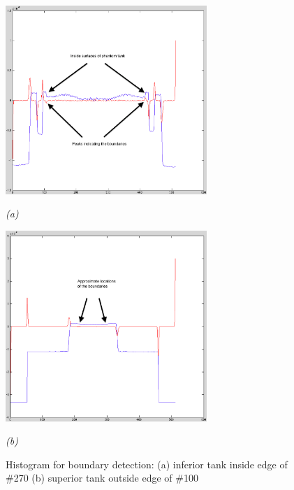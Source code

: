 \begin{figure}[htb]
  \begin{minipage}[b]{3in}
    \centering
    \centerline{\mbox{\includegraphics[width=3in]{data_extraction/images/sample/20121017_270/Coronal/inferior_inside/histogram_marked.eps}}}
    \centerline{\emph{(a)}}
  \end{minipage}
  \hfill
  \begin{minipage}[b]{3in}
    \centering
    \centerline{\mbox{\includegraphics[width=3in]{data_extraction/images/sample/20121017_100/Coronal/superior_outside/superior_outside_histogram_marked.eps}}}
    \centerline{\emph{(b)}}
  \end{minipage}

  \caption{Histogram for boundary detection: (a) inferior tank inside edge of \#270 (b) superior tank outside edge of \#100}
  \label{fig:coronal_boundaries_histogram}
\end{figure}


